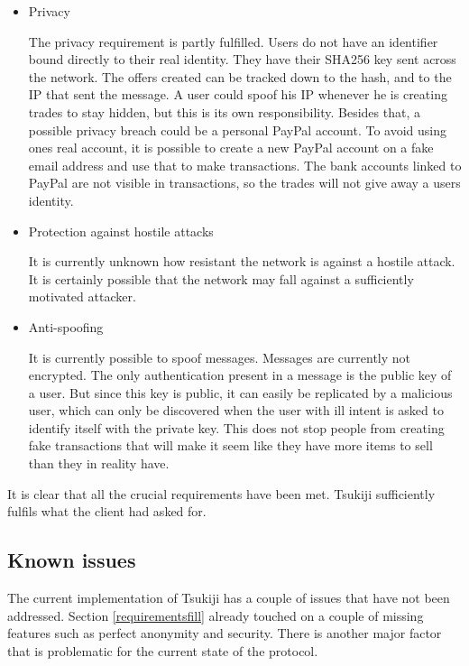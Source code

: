 \begin{itemize}
\item Privacy

The privacy requirement is partly fulfilled.
Users do not have an identifier bound directly to their real identity.
They have their SHA256 key sent across the network.
The offers created can be tracked down to the hash, and to the IP that sent the message.
A user could spoof his IP whenever he is creating trades to stay hidden, but this is its own responsibility.
Besides that, a possible privacy breach could be a personal PayPal account.
To avoid using ones real account, it is possible to create a new PayPal account on a fake email address and use that to make transactions.
The bank accounts linked to PayPal are not visible in transactions, so the trades will not give away a users identity.

\item Protection against hostile attacks

It is currently unknown how resistant the network is against a hostile attack.
It is certainly possible that the network may fall against a sufficiently motivated attacker.

\item Anti-spoofing

It is currently possible to spoof messages.
Messages are currently not encrypted.
The only authentication present in a message is the public key of a user. 
But since this key is public, it can easily be replicated by a malicious user, which can only be discovered when the user with ill intent is asked to identify itself with the private key.
This does not stop people from creating fake transactions that will make it seem like they have more items to sell than they in reality have.
\end{itemize}

It is clear that all the crucial requirements have been met.
Tsukiji sufficiently fulfils what the client had asked for.

\subsection{Known issues}
\label{knownissues}
The current implementation of Tsukiji has a couple of issues that have not been addressed.
Section \ref{requirementsfill} already touched on a couple of missing features such as perfect anonymity and security.
There is another major factor that is problematic for the current state of the protocol.


